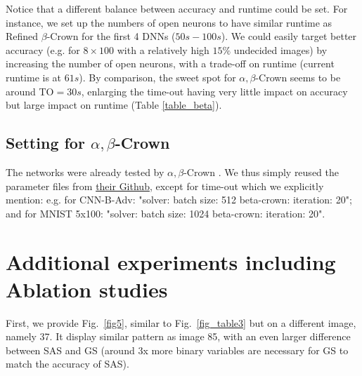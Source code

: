 Notice that a different balance between accuracy and runtime could be set. For instance, we set up the numbers of open neurons to have similar runtime as Refined $\beta$-Crown for the first 4 DNNs ($50s-100s$). We could easily target better accuracy (e.g. for $8 \times 100$ with a relatively high $15\%$ undecided images) by increasing the number of open neurons, with a trade-off on runtime (current runtime is at $61s$).
By comparison, the sweet spot for $\alpha,\beta$-Crown seems to be around TO$=30s$, enlarging the time-out having very little impact on accuracy but large impact on runtime
(Table \ref{table_beta}).






\subsection*{Setting for $\alpha,\beta$-Crown}

The networks were already tested by $\alpha,\beta$-Crown \cite{crown}. We thus simply reused the parameter files from \href{https://github.com/Verified-Intelligence/alpha-beta-CROWN/blob/main/complete_verifier/exp_configs/beta_crown/}{their Github}, 
except for time-out which we explicitly mention:
e.g. for CNN-B-Adv: "solver: batch size: 512 beta-crown: iteration: 20"; and
for MNIST 5x100: "solver: batch size: 1024 beta-crown: iteration: 20".






\section{Additional experiments including Ablation studies}	


First, we provide Fig.~\ref{fig5}, similar to 
Fig.~\ref{fig_table3} but on a different image, namely 37.
It display similar pattern as image 85, with an even larger difference between SAS and GS (around 3x more binary variables are necessary for GS to match the accuracy of SAS).

